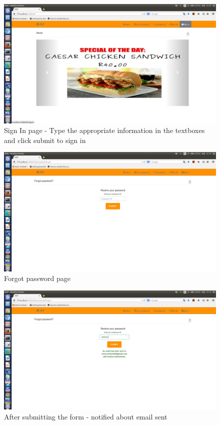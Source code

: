 \documentclass[a4paper,12pt]{article}
\begin{document}
\begin{figure}[H]
  \centering
    \includegraphics[width=1.0\textwidth]{screenshots/signIn.png}
    \caption{Sign In page - Type the appropriate information in the textboxes and click submit to sign in} 
\end{figure}

\begin{figure}[H]
  \centering
    \includegraphics[width=1.0\textwidth]{screenshots/ForgotPass.png}
    \caption{Forgot password page} 
\end{figure}


\begin{figure}[H]
  \centering
    \includegraphics[width=1.0\textwidth]{screenshots/emailSentForPass.png}
    \caption{After submitting the form - notified about email sent} 
\end{figure}
\end{document}
